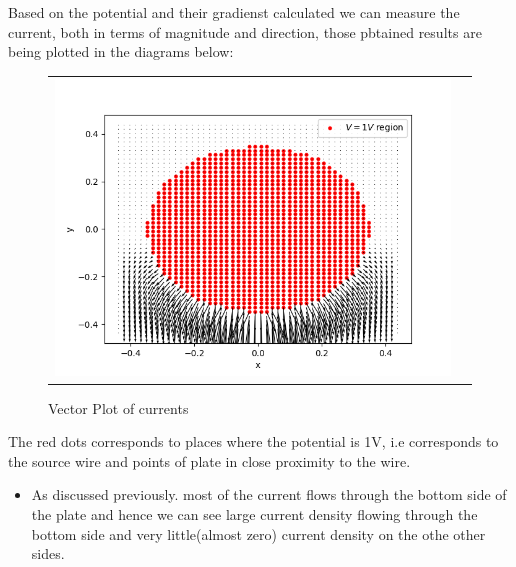 \documentclass[11pt, a4paper]{article}
\begin{document}
       Based on the potential and their gradienst calculated we can measure the current, both in terms of magnitude and direction, those pbtained results are being plotted in the diagrams below:   
                 \begin{figure}[H]
                    \centering
                    \setlength\tabcolsep{2pt}
                    \begin{tabular}{cc}
                       \includegraphics[scale=0.9]{Fig7.png}
                    \end{tabular}
                    \caption{Vector Plot of currents} 
                \end{figure}
 	
 	The red dots corresponds to places where the potential is 1V, i.e corresponds to the source wire and points of plate in close proximity to the wire. 
 		
           \begin{itemize}
           \item
           As discussed previously. most of the current flows through the bottom side of the plate and hence we can see large current density flowing through the bottom side and very little(almost zero) current density on the othe other sides.          
           \end{itemize}
                      
\end{document}
